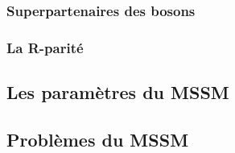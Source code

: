 \subsubsection{Superpartenaires des bosons}



\subsubsection{La R-parité}

\subsection{Les paramètres du MSSM}
\label{sec:susy:mssm:params}

\subsection{Problèmes du MSSM}

